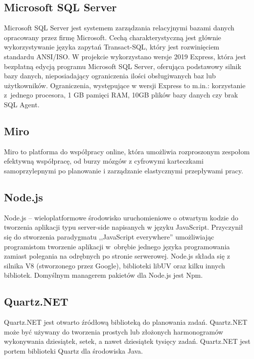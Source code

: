 \documentclass[12pt,a4paper]{article}
\begin{document}
		\subsection{Microsoft SQL Server}		 
		 	\indent Microsoft SQL Server jest systemem zarządzania relacyjnymi bazami danych opracowany przez firmę Microsoft. Cechą charakterystyczną jest głównie wykorzystywanie języka
		 	zapytań	Transact-SQL, który jest rozwinięciem standardu ANSI/ISO. W projekcie wykorzystano wersje 2019 Express, która jest bezpłatną edycją programu Microsoft SQL Server, oferująca
		 	podstawowy silnik bazy danych, nieposiadający ograniczenia ilości obsługiwanych baz lub użytkowników. Ograniczenia, występujące w wersji Express to  m.in.:
		 	korzystanie z~jednego procesora, 1 GB pamięci RAM, 10GB plików bazy danych czy brak SQL Agent.
			
		\subsection{Miro}
			\indent Miro to platforma do współpracy online, która umożliwia rozproszonym zespołom efektywną współpracę, od burzy mózgów z cyfrowymi karteczkami samoprzylepnymi
					po planowanie i zarządzanie elastycznymi przepływami pracy.
		\subsection{Node.js}
			\indent Node.js – wieloplatformowe środowisko uruchomieniowe o otwartym kodzie do tworzenia aplikacji typu server-side napisanych w języku JavaScript.
			Przyczynił się do stworzenia paradygmatu ,,JavaScript everywhere'' umożliwiając programistom tworzenie aplikacji w~obrębie jednego języka programowania zamiast
			polegania na odrębnych po stronie serwerowej. Node.js składa się z silnika V8 (stworzonego przez Google), biblioteki libUV oraz kilku innych bibliotek.
			Domyślnym managerem pakietów dla Node.js jest Npm. 
			
		\subsection{Quartz.NET}
			\indent Quartz.NET jest otwarto źródłową biblioteką do planowania zadań.
			Quartz.NET może być używany do tworzenia prostych lub złożonych harmonogramów wykonywania
			dziesiątek, setek, a nawet dziesiątek tysięcy zadań.
			Quartz.NET jest portem biblioteki Quartz dla środowiska Java. 	 
		
\end{document}
